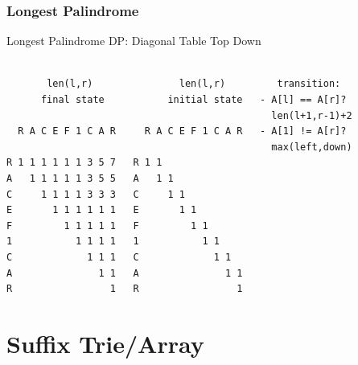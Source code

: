 \begin{frame}[fragile]
  \frametitle{Longest Palindrome}

  Longest Palindrome DP: Diagonal Table Top Down

  {\smaller
\begin{verbatim}

       len(l,r)               len(l,r)         transition:
      final state           initial state   - A[l] == A[r]?
                                              len(l+1,r-1)+2
  R A C E F 1 C A R     R A C E F 1 C A R   - A[1] != A[r]?
                                              max(left,down)
R 1 1 1 1 1 1 3 5 7   R 1 1
A   1 1 1 1 1 3 5 5   A   1 1
C     1 1 1 1 3 3 3   C     1 1
E       1 1 1 1 1 1   E       1 1
F         1 1 1 1 1   F         1 1
1           1 1 1 1   1           1 1
C             1 1 1   C             1 1
A               1 1   A               1 1
R                 1   R                 1

\end{verbatim}

  }
\end{frame}


\section{Suffix Trie/Array} %
